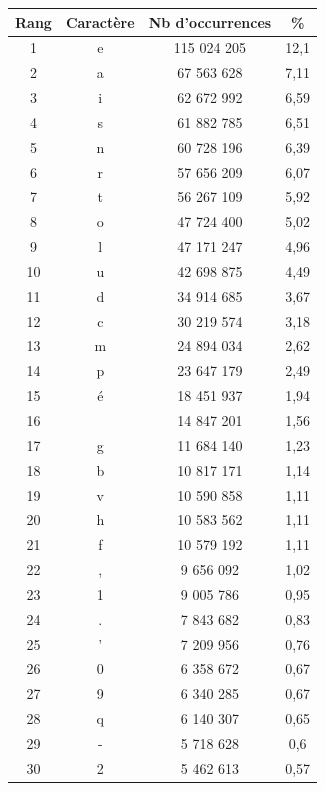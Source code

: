 \documentclass[a4paper,12pt,titlepage]{report}
\begin{document}
\newpage

\begin{table}[h!]
\begin{tabular}{|c|c|c|c|}
\hline
\textbf{Rang} & \textbf{Caractère} & \textbf{Nb d'occurrences} & \textbf{\%} \\
\hline
1 &	e &	115 024 205 & 12,1 \\
\hline
2 &	a &	67 563 628 & 7,11 \\
\hline
3 &	i &	62 672 992 & 6,59 \\
\hline
4 &	s &	61 882 785 & 6,51 \\
\hline
5 &	n &	60 728 196 & 6,39 \\
\hline
6 &	r &	57 656 209 & 6,07 \\
\hline
7 &	t &	56 267 109 & 5,92 \\
\hline
8 &	o &	47 724 400 & 5,02 \\
\hline
9 &	l &	47 171 247 & 4,96 \\
\hline
10 & u & 42 698 875 & 4,49 \\
\hline
11 & d & 34 914 685 & 3,67 \\
\hline
12 & c & 30 219 574 & 3,18 \\
\hline
13 & m & 24 894 034 & 2,62 \\
\hline
14 & p & 23 647 179 & 2,49 \\
\hline
15 & é & 18 451 937 & 1,94 \\
\hline
16 &   & 14 847 201 & 1,56 \\
\hline
17 & g & 11 684 140 & 1,23 \\
\hline
18 & b & 10 817 171 & 1,14 \\
\hline
19 & v & 10 590 858 & 1,11 \\ 
\hline
20 & h & 10 583 562 & 1,11 \\ 
\hline
21 & f & 10 579 192 & 1,11 \\
\hline
22 & , &  9 656 092 & 1,02 \\
\hline
23 & 1 &  9 005 786 & 0,95 \\
\hline
24 & . &  7 843 682 & 0,83 \\
\hline
25 & ' &  7 209 956 & 0,76 \\
\hline
26 & 0 &  6 358 672 & 0,67 \\
\hline
27 & 9 &  6 340 285 & 0,67 \\
\hline
28 & q &  6 140 307 & 0,65 \\
\hline
29 & - &  5 718 628 & 0,6  \\
\hline
30 & 2 &  5 462 613 & 0,57 \\

\end{tabular}
\end{table}
\end{document}
